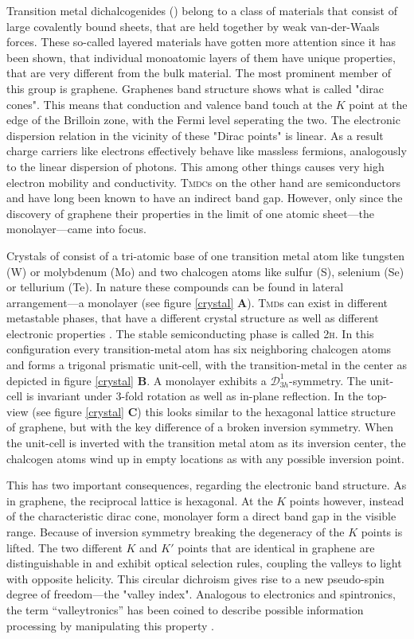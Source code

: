 Transition metal dichalcogenides (\tmds\!) belong to a class of materials that consist of large covalently bound sheets, that are held together by weak van-der-Waals forces. These so-called layered materials have gotten more attention since it has been shown, that individual monoatomic layers of them have unique properties, that are very different from the bulk material. The most prominent member of this group is graphene. Graphenes band structure shows what is called "dirac cones". This means that conduction and valence band touch at the $K$ point at the edge of the Brilloin zone, with the Fermi level seperating the two. The electronic dispersion relation in the vicinity of these "Dirac points" is linear. As a result charge carriers like electrons effectively behave like massless fermions, analogously to the linear dispersion of photons. This among other things causes very high electron mobility and conductivity. \textsc{Tmdc}s on the other hand are semiconductors and have long been known to have an indirect band gap. However, only since the discovery of graphene their properties in the limit of one atomic sheet---the monolayer---came into focus. 

Crystals of \tmds consist of a tri-atomic base of one transition metal atom like tungsten (W) or molybdenum (Mo) and two chalcogen atoms like sulfur (S), selenium (Se) or tellurium (Te). In nature these compounds can be found in lateral arrangement---a \tmdg monolayer (see figure \ref{crystal} \textbf{A}). \textsc{Tmd}s can exist in different metastable phases, that have a different crystal structure as well as different electronic properties \cite{ouyang_phase_2015}. The stable semiconducting phase is called 2\textsc{h}. In this configuration every transition-metal atom has six neighboring chalcogen atoms and forms a trigonal prismatic unit-cell, with the transition-metal in the center as depicted in figure \ref{crystal} \textbf{B}. A \tmdg monolayer exhibits a $\mathcal{D}^1_{3h}$-symmetry. The unit-cell is invariant under 3-fold rotation as well as in-plane reflection. In the top-view (see figure \ref{crystal} \textbf{C}) this looks similar to the hexagonal lattice structure of graphene, but with the key difference of a broken inversion symmetry. When the unit-cell is inverted with the transition metal atom as its inversion center, the chalcogen atoms wind up in empty locations as with any possible inversion point.

This has two important consequences, regarding the electronic band structure. As in graphene, the reciprocal lattice is hexagonal. At the $K$ points however, instead of the characteristic dirac cone, monolayer \tmds form a direct band gap in the visible range. Because of inversion symmetry breaking the degeneracy of the $K$ points is lifted. The two different $K$ and $K'$ points that are identical in graphene are distinguishable in \tmds and exhibit optical selection rules, coupling the valleys to light with opposite helicity. This circular dichroism gives rise to a new pseudo-spin degree of freedom---the "valley index". Analogous to electronics and spintronics, the term ``valleytronics'' has been coined to describe possible information processing by manipulating this property \cite{wang_electronics_2012, xiao_coupled_2012}. 

